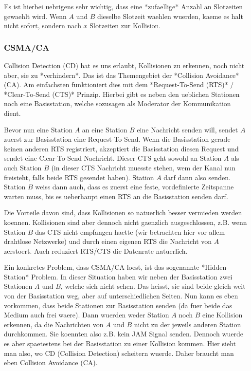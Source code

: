 Es ist hierbei uebrigens sehr wichtig, dass eine *zufaellige* Anzahl an
Slotzeiten gewaehlt wird. Wenn $A$ und $B$ dieselbe Slotzeit waehlen wuerden,
kaeme es halt nicht sofort, sondern nach $x$ Slotzeiten zur Kollision.

\subsubsection{CSMA/CA} 

Collision Detection (CD) hat es uns erlaubt, Kollisionen zu erkennen, noch nicht
aber, sie zu *verhindern*. Das ist das Themengebiet der *Collision Avoidance*
(CA). Am einfachsten funktioniert dies mit dem *Request-To-Send (RTS)* /
*Clear-To-Send (CTS)* Prinzip. Hierbei gibt es neben den ueblichen Stationen
noch eine Basisstation, welche sozusagen als Moderator der Kommunikation dient.

Bevor nun eine Station $A$ an eine Station $B$ eine Nachricht senden will,
sendet $A$ zuerst zur Basisstation eine Request-To-Send. Wenn die Basisstation
gerade keinen anderen RTS registriert, akzeptiert die Basisstation diesen
Request und sendet eine Clear-To-Send Nachricht. Dieser CTS geht sowohl an
Station $A$ als auch Station $B$ (in dieser CTS Nachricht muesste stehen, wem
der Kanal nun freisteht, falls beide RTS gesendet haben). Station $A$ darf dann
also senden. Station $B$ weiss dann auch, dass es zuerst eine feste,
vordefinierte Zeitspanne warten muss, bis es ueberhaupt einen RTS an die
Basisstation senden darf.

Die Vorteile davon sind, dass Kollisionen so natuerlich besser vermieden werden
koennen. Kollisionen sind aber dennoch nicht gaenzlich ausgeschlossen, z.B. wenn
Station $B$ das CTS nicht empfangen haette (wir betrachten hier vor allem
drahtlose Netzwerke) und durch einen eigenen RTS die Nachricht von $A$
zerstoert. Auch reduziert RTS/CTS die Datenrate natuerlich.

Ein konkretes Problem, dass CSMA/CA loest, ist das sogenannte *Hidden-Station*
Problem. In dieser Situation haben wir neben der Basisstation zwei Stationen $A$
und $B$, welche sich nicht sehen. Das heisst, sie sind beide gleich weit von der
Basisstation weg, aber auf unterschiedlichen Seiten. Nun kann es eben vorkommen,
dass beide Stationen zur Basisstation senden (da fuer beide das Medium auch frei
waere). Dann wuerden weder Station $A$ noch $B$ eine Kollision erkennen, da die
Nachrichten von $A$ und $B$ nicht zu der jeweils anderen Station
durchkommen. Sie koennten also z.B. kein JAM Signal senden. Dennoch wuerde es
aber spaetestens bei der Basisstation zu einer Kollision kommen. Hier sieht man
also, wo CD (Collision Detection) scheitern wuerde. Daher braucht man eben
Collision Avoidance (CA).

